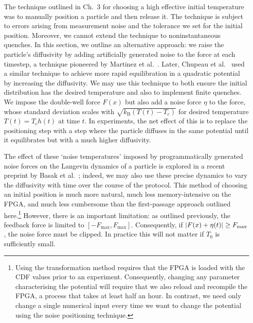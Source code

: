 \documentclass[hyperref={colorlinks=true, urlcolor=blue, citecolor=blue, final, bound}]{sfuthesis}
\newcommand{\kB}{k_{\mathrm{B}}}
\begin{document}
The technique outlined in Ch.~3 for choosing a high effective initial temperature was to manually position a particle and then release it. The technique is subject to errors arising from measurement noise and the tolerance we set for the initial position. Moreover, we cannot extend the technique to noninstantaneous quenches. In this section, we outline an alternative approach: we raise the particle's diffusivity by adding artificially generated noise to the force at each timestep, a technique pioneered by Martinez et al.~\cite{Martinez2013}. Later, Chupeau et al.~\cite{Chupeau2018} used a similar technique to achieve more rapid equilibration in a quadratic potential by increasing the diffusivity. We may use this technique to both ensure the initial distribution has the desired temperature and also to implement finite quenches. We impose the double-well force $F(x)$ but also add a noise force $\eta$ to the force, whose standard deviation scales with $\sqrt{\kB (T(t)-T_c)}$ for desired temperature $T(t)=T_ch(t)$ at time $t$. In experiments, the net effect of this is to replace the positioning step with a step where the particle diffuses in the same potential until it equilibrates but with a much higher diffusivity.

The effect of these `noise temperatures' imposed by programmatically generated noise forces on the Langevin dynamics of a particle is explored in a recent preprint by Basak et al.~\cite{Basak2026}; indeed, we may also use these precise dynamics to vary the diffusivity with time over the course of the protocol. This method of choosing an initial position is much more natural, much less memory-intensive on the FPGA, and much less cumbersome than the first-passage approach outlined here.\footnote{Using the transformation method requires that the FPGA is loaded with the CDF values prior to an experiment. Consequently, changing any parameter characterising the potential will require that we also reload and recompile the FPGA, a process that takes at least half an hour. In contrast, we need only change a single numerical input every time we want to change the potential using the noise positioning technique.} However, there is an important limitation: as outlined previously, the feedback force is limited to $[-F_{\max}, F_{\max}]$. Consequently, if $\abs{F(x)+\eta(t)} \geq F_{\max}$, the noise force must be clipped. In practice this will not matter if $T_0$ is sufficiently small. 
\end{document}
